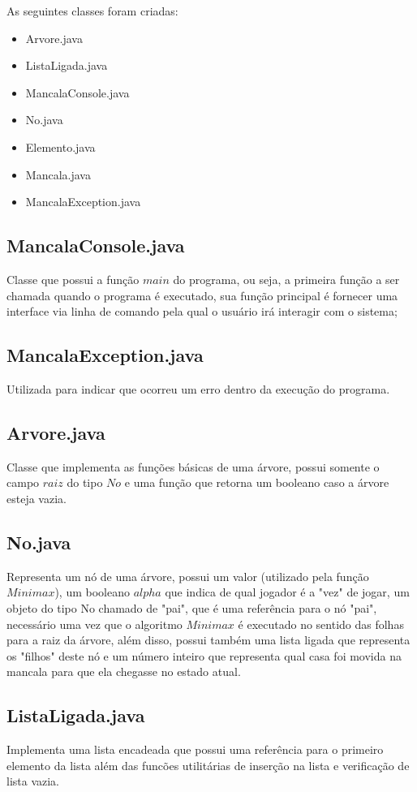 \documentclass[a4paper,11pt]{article}
\begin{document}
As seguintes classes foram criadas:
\begin{itemize}
  \item Arvore.java   
  \item ListaLigada.java
  \item MancalaConsole.java
  \item No.java
  \item Elemento.java
  \item Mancala.java
  \item MancalaException.java
\end{itemize}

\subsection{MancalaConsole.java}
Classe que possui a função $main$ do programa, ou seja, a primeira função a ser chamada quando o programa é executado, sua função principal é fornecer uma interface via linha de comando pela qual o usuário irá interagir com o sistema;

\subsection{MancalaException.java}
Utilizada para indicar que ocorreu um erro dentro da execução do programa.

\subsection{Arvore.java}
Classe que implementa as funções básicas de uma árvore, possui somente o campo $raiz$ do tipo $No$ e uma função que retorna um booleano caso a árvore esteja vazia.

\subsection{No.java}
Representa um nó de uma árvore, possui um valor (utilizado pela função $Minimax$), um booleano $alpha$ que indica de qual jogador é a "vez" de jogar, um objeto do tipo No chamado de "pai", que é uma referência para o nó "pai", necessário uma vez que o algoritmo $Minimax$ é executado no sentido das folhas para a raiz da árvore, além disso, possui também uma lista ligada que representa os "filhos" deste nó e um número inteiro que representa qual casa foi movida na mancala para que ela chegasse no estado atual.

\subsection{ListaLigada.java}
Implementa uma lista encadeada que possui uma referência para o primeiro elemento da lista além das funcões utilitárias de inserção na lista e verificação de lista vazia.
\end{document}
